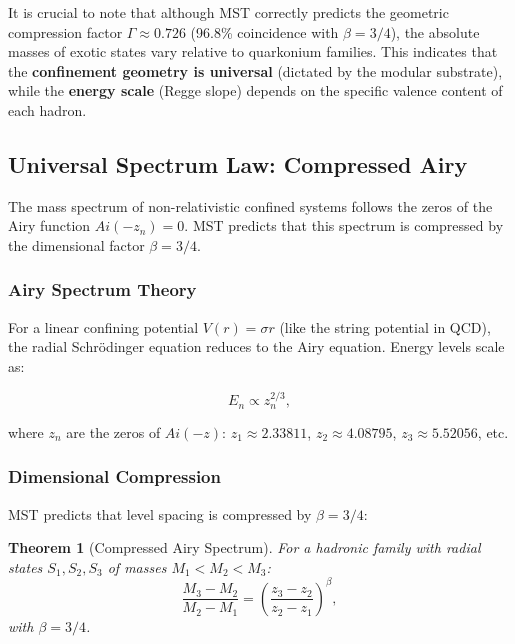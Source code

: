 \documentclass[11pt, a4paper]{article}
\theoremstyle{plain}
\newtheorem{theorem}{Theorem}[section]
\theoremstyle{definition}
\begin{document}
It is crucial to note that although MST correctly predicts the geometric compression factor $\Gamma \approx 0.726$ (96.8\% coincidence with $\beta=3/4$), the absolute masses of exotic states vary relative to quarkonium families. This indicates that the \textbf{confinement geometry is universal} (dictated by the modular substrate), while the \textbf{energy scale} (Regge slope) depends on the specific valence content of each hadron.

\subsection{Universal Spectrum Law: Compressed Airy}
\label{subsec:airy_spectrum}

The mass spectrum of non-relativistic confined systems follows the zeros of the Airy function $Ai(-z_n)=0$. MST predicts that this spectrum is compressed by the dimensional factor $\beta = 3/4$.

\subsubsection{Airy Spectrum Theory}

For a linear confining potential $V(r) = \sigma r$ (like the string potential in QCD), the radial Schrödinger equation reduces to the Airy equation. Energy levels scale as:

\begin{equation}
E_n \propto z_n^{2/3},
\end{equation}

where $z_n$ are the zeros of $Ai(-z)$: $z_1 \approx 2.33811$, $z_2 \approx 4.08795$, $z_3 \approx 5.52056$, etc.

\subsubsection{Dimensional Compression}

MST predicts that level spacing is compressed by $\beta = 3/4$:

\begin{theorem}[Compressed Airy Spectrum]
For a hadronic family with radial states $S_1, S_2, S_3$ of masses $M_1 < M_2 < M_3$:
\begin{equation}
\frac{M_3 - M_2}{M_2 - M_1} = \left(\frac{z_3 - z_2}{z_2 - z_1}\right)^\beta,
\label{eq:airy_compressed}
\end{equation}
with $\beta = 3/4$.
\end{theorem}
\end{document}
